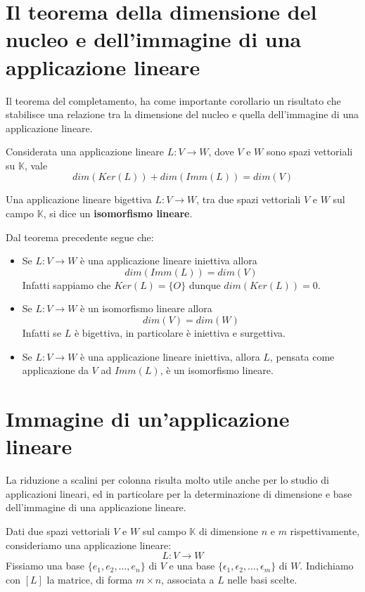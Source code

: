 \section{Il teorema della dimensione del nucleo e dell'immagine di una applicazione lineare}
Il teorema del completamento, ha come importante corollario un risultato che stabilisce
una relazione tra la dimensione del nucleo e quella dell'immagine di una applicazione
lineare.

\begin{theorem}
	Considerata una applicazione lineare $L : V \to W$, dove $V$ e $W$ sono spazi
	vettoriali su $\mathbb{K}$, vale
	\begin{equation*}
		dim(Ker(L)) + dim(Imm(L)) = dim(V)
	\end{equation*}
\end{theorem}

\begin{defn}
	Una applicazione lineare bigettiva $L : V \to W$, tra due spazi vettoriali $V$ e $W$
	sul campo $\mathbb{K}$, si dice un \textbf{isomorfismo lineare}.

	Dal teorema precedente segue che:
	\begin{itemize}
		\item Se $L : V \to W$ \`e una applicazione lineare iniettiva allora
		      \[ dim(Imm(L)) = dim(V) \]
		      Infatti sappiamo che $Ker(L) = \{O\}$ dunque $dim(Ker(L)) = 0$.
		\item Se $L : V \to W$ \`e un isomorfismo lineare allora \[dim(V) = dim(W)\]
		      Infatti se $L$ \`e bigettiva, in particolare \`e iniettiva e surgettiva.
		\item Se $L : V \to W$ \`e una applicazione lineare iniettiva, allora $L$,
		      pensata come applicazione da $V$ ad $Imm(L)$, \`e un isomorfismo lineare.
	\end{itemize}
\end{defn}

\section{Immagine di un'applicazione lineare}
La riduzione a scalini per colonna risulta molto utile anche per lo
studio di applicazioni lineari, ed in particolare per la
determinazione di dimensione e base dell'immagine di una applicazione
lineare.

Dati due spazi vettoriali $V$ e $W$ sul campo $\mathbb{K}$ di dimensione $n$
e $m$ rispettivamente, consideriamo una applicazione lineare:
\begin{equation*}
	L : V \to W
\end{equation*}
Fissiamo una base $\{e_1, e_2, \dots, e_n\}$ di $V$ e una base
$\{\epsilon_1, \epsilon_2, \dots, \epsilon_m\}$ di $W$. Indichiamo con $[L]$
la matrice, di forma $m \times n$, associata a $L$ nelle basi scelte.

